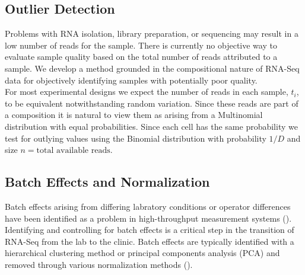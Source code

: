 \documentclass{article}\usepackage[]{graphicx}\usepackage[]{color}
\begin{document}

\subsection{Outlier Detection}
Problems with RNA isolation, library preparation, or sequencing may result in a low number of reads for the sample.  There is currently no objective way to evaluate sample quality based on the total number of reads attributed to a sample. We develop a method grounded in the compositional nature of RNA-Seq data for objectively identifying samples with potentially poor quality.\\

For most experimental designs we expect the number of reads in each sample, $t_i$, to be equivalent notwithstanding random variation.   Since these reads are part of a composition it is natural to view them as arising from a Multinomial distribution with equal probabilities. Since each cell has the same probability we test for outlying values using the Binomial distribution with probability $1/D$ and size $n = \text{total available reads}$.



\subsection{Batch Effects and Normalization}
Batch effects arising from differing labratory conditions or operator differences have been identified as a problem in high-throughput measurement systems (\cite{leek2010, chen2011}).  Identifying and controlling for batch effects is a critical step in the transition of RNA-Seq from the lab to the clinic.  Batch effects are typically identified with a hierarchical clustering method or principal components analysis (PCA) and removed through various normalization methods (\cite{Robinson2007, Anders2010, Robinson2010, Law2014, leek2014}).  \\ 
\end{document}
